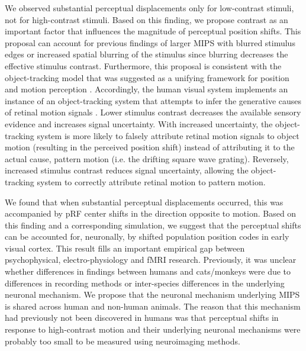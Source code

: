 We observed substantial perceptual displacements only for low-contrast stimuli, not for high-contrast stimuli. Based on this finding, we propose contrast as an important factor that influences the magnitude of perceptual position shifts. This proposal can account for previous findings of larger MIPS with blurred stimulus edges \parencite{Fu2001, Kwon2015} or increased spatial blurring of the stimulus \parencite{Fu2001} since blurring decreases the effective stimulus contrast. Furthermore, this proposal is consistent with the object-tracking model that was suggested as a unifying framework for position and motion perception \parencite{Kwon2015}. Accordingly, the human visual system implements an instance of an object-tracking system that attempts to infer the generative causes of retinal motion signals \parencite{Kwon2015}. Lower stimulus contrast decreases the available sensory evidence and increases signal uncertainty. With increased uncertainty, the object-tracking system is more likely to falsely attribute retinal motion signals to object motion (resulting in the perceived position shift) instead of attributing it to the actual cause, pattern motion (i.e. the drifting square wave grating). Reversely, increased stimulus contrast reduces signal uncertainty, allowing the object-tracking system to correctly attribute retinal motion to pattern motion.

We found that when substantial perceptual displacements occurred, this was accompanied by pRF center shifts in the direction opposite to motion. Based on this finding and a corresponding simulation, we suggest that the perceptual shifts can be accounted for, neuronally, by shifted population position codes in early visual cortex. This result fills an important empirical gap between psychophysical, electro-physiology and fMRI research. Previously, it was unclear whether differences in findings between humans and cats/monkeys were due to differences in recording methods or inter-species differences in the underlying neuronal mechanism. We propose that the neuronal mechanism underlying MIPS is shared across human and non-human animals. The reason that this mechanism had previously not been discovered in humans was that perceptual shifts in response to high-contrast motion and their underlying neuronal mechanisms were probably too small to be measured using neuroimaging methods.

